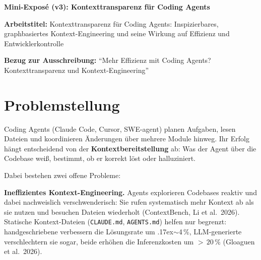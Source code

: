 \documentclass[12pt,a4paper]{scrartcl}
\newcommand{\code}[1]{\texttt{#1}}
\begin{document}
\begin{center}
  {\LARGE\bfseries Mini-Exposé (v3): Kontexttransparenz für Coding Agents\par}
\end{center}

\vspace{0.6em}

\noindent\textbf{Arbeitstitel:} Kontexttransparenz für Coding Agents: Inspizierbares,
graphbasiertes Kontext-Engineering und seine Wirkung auf Effizienz und Entwicklerkontrolle

\smallskip

\noindent\textbf{Bezug zur Ausschreibung:} \enquote{Mehr Effizienz mit Coding Agents?
Kontexttransparenz und Kontext-Engineering}

\hrulefill

\section{Problemstellung}

Coding Agents (Claude Code, Cursor, SWE-agent) planen Aufgaben, lesen Dateien und
koordinieren Änderungen über mehrere Module hinweg. Ihr Erfolg hängt entscheidend von der
\textbf{Kontextbereitstellung} ab: Was der Agent über die Codebase weiß, bestimmt, ob er
korrekt löst oder halluziniert.

Dabei bestehen zwei offene Probleme:

\textbf{Ineffizientes Kontext-Engineering.} Agents explorieren Codebases reaktiv und dabei
nachweislich verschwenderisch: Sie rufen systematisch mehr Kontext ab als sie nutzen und
besuchen Dateien wiederholt (ContextBench, Li et al.\ 2026). Statische Kontext-Dateien
(\code{CLAUDE.md}, \code{AGENTS.md}) helfen nur begrenzt: handgeschriebene verbessern die
Lösungsrate um {\raise.17ex\hbox{$\scriptstyle\sim$}}4\,\%, LLM-generierte verschlechtern sie
sogar, beide erhöhen die Inferenzkosten um ${>}\,20\,\%$ (Gloaguen et al.\ 2026).
\end{document}
